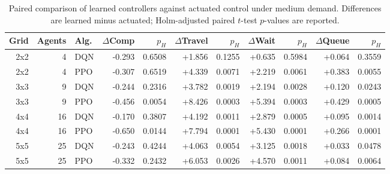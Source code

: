 \begin{table}[htbp]
\centering
\caption{Paired comparison of learned controllers against actuated control under medium demand. Differences are learned minus actuated; Holm-adjusted paired $t$-test $p$-values are reported.}
\label{tab:learned_vs_actuated_stats_v2}
\scriptsize
\begin{tabular}{rrlrrrrrrrr}
\hline
Grid & Agents & Alg. & $\Delta$Comp & $p_H$ & $\Delta$Travel & $p_H$ & $\Delta$Wait & $p_H$ & $\Delta$Queue & $p_H$ \\
\hline
2x2 & 4 & DQN & -0.293 & 0.6508 & +1.856 & 0.1255 & +0.635 & 0.5984 & +0.064 & 0.3559 \\
2x2 & 4 & PPO & -0.307 & 0.6519 & +4.339 & 0.0071 & +2.219 & 0.0061 & +0.383 & 0.0055 \\
\hline
3x3 & 9 & DQN & -0.244 & 0.2316 & +3.782 & 0.0019 & +2.194 & 0.0028 & +0.120 & 0.0243 \\
3x3 & 9 & PPO & -0.456 & 0.0054 & +8.426 & 0.0003 & +5.394 & 0.0003 & +0.429 & 0.0005 \\
\hline
4x4 & 16 & DQN & -0.170 & 0.3807 & +4.192 & 0.0011 & +2.879 & 0.0005 & +0.095 & 0.0014 \\
4x4 & 16 & PPO & -0.650 & 0.0144 & +7.794 & 0.0001 & +5.430 & 0.0001 & +0.266 & 0.0001 \\
\hline
5x5 & 25 & DQN & -0.243 & 0.4244 & +4.063 & 0.0054 & +3.125 & 0.0018 & +0.033 & 0.0478 \\
5x5 & 25 & PPO & -0.332 & 0.2432 & +6.053 & 0.0026 & +4.570 & 0.0011 & +0.084 & 0.0064 \\
\hline
\end{tabular}
\end{table}
